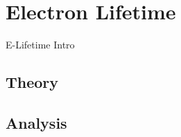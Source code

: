 
\section{Electron Lifetime}
\label{sec:elifetime}


E-Lifetime Intro

\subsection{Theory}


\subsection{Analysis}


